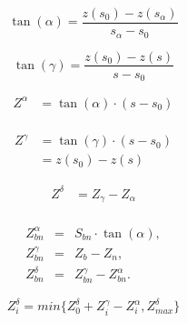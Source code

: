 \documentclass[10pt,a4paper]{article}
\begin{document}
	
	\begin{equation}
		\tan(\alpha) = \frac{z(s_0) - z(s_{\alpha})}{s_{\alpha} - s_0}
	\end{equation}

	\begin{equation}
		\tan(\gamma) = \frac{z(s_0) - z(s)}{s - s_0}
	\end{equation}
	
	\begin{equation}
		\begin{split}
			Z^{\alpha} & = \tan(\alpha) \cdot (s - s_0) \\
		\end{split}
	\end{equation}

	\begin{equation}
		\begin{split}
			Z^{\gamma} & = \tan(\gamma) \cdot (s - s_0) \\
			& = z(s_0) - z(s)
		\end{split}
	\end{equation}

	\begin{equation}
		\begin{split}
			Z^{\delta} & = Z_{\gamma} - Z_{\alpha} \\
		\end{split}
	\end{equation}
	
	\begin{eqnarray}\label{equation:intensity} 
		Z^{\alpha}_{bn} &=& S_{bn} \cdot \tan(\alpha), \\
		Z^{\gamma}_{bn} &=& Z_b -Z_{n}, \\
		Z^\delta_{bn}  &=& Z^{\gamma}_{bn} - Z^{\alpha}_{bn}.
	\end{eqnarray}

	\begin{equation}\label{equation:intensity_min}
		Z^\delta_{i} = min\{ Z^{\delta}_0 + Z^{\gamma}_i - Z^{\alpha}_i, Z^\delta_{max}  \}
	\end{equation}



\end{document}
